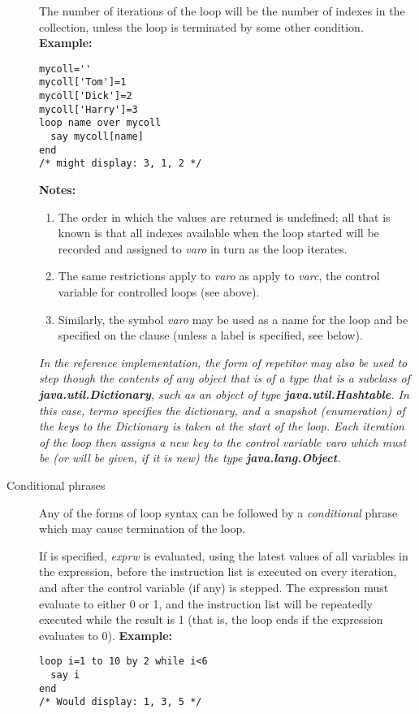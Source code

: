 \begin{description}
The number of iterations of the loop will be the number of indexes in
the collection, unless the loop is terminated by some other condition.
 \textbf{Example:}
\begin{lstlisting}
mycoll=''
mycoll['Tom']=1
mycoll['Dick']=2
mycoll['Harry']=3
loop name over mycoll
  say mycoll[name]
end
/* might display: 3, 1, 2 */
\end{lstlisting}
 \textbf{Notes:}
\begin{enumerate}
\item 
The order in which the values are returned is undefined; all that
is known is that all indexes available when the loop started will be
recorded and assigned to \emph{varo} in turn as the loop iterates.
\item 
The same restrictions apply to \emph{varo} as apply to
\emph{varc}, the control variable for controlled loops (see above).
\item 
Similarly, the symbol \emph{varo} may be used as a name for the loop
and be specified on the  clause (unless a label is
specified, see below).
\end{enumerate}
 \emph{In the reference implementation, the  form of
repetitor may also be used to step though the contents of any object
that is of a type that is a subclass of \textbf{java.util.Dictionary},
such as an object of type \textbf{java.util.Hashtable}.
In this case, \emph{termo} specifies the dictionary, and a snapshot
(enumeration) of the keys to the Dictionary is taken at the start of the
loop.
Each iteration of the loop then assigns a new key to the control
variable \emph{varo} which must be (or will be given, if it is new)
the type \textbf{java.lang.Object}.
}
\item[Conditional phrases]\label{refloopwu}

Any of the forms of loop syntax can be followed by a
\emph{conditional} phrase which may cause termination of the loop.
 
If  is specified, \emph{exprw} is evaluated, using the
latest values of all variables in the expression, before the instruction
list is executed on every iteration, and after the control
variable (if any) is stepped.
The expression must evaluate to either 0 or 1, and the instruction list
will be repeatedly executed while the result is 1 (that is, the loop
ends if the expression evaluates to 0).
 \textbf{Example:}
\begin{lstlisting}
loop i=1 to 10 by 2 while i<6
  say i
end
/* Would display: 1, 3, 5 */
\end{lstlisting}
 

\end{description}
